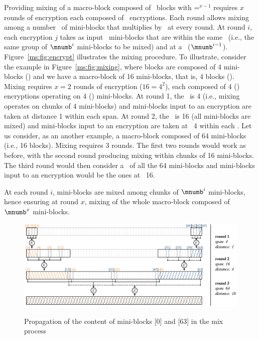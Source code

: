Providing mixing of a macro-block composed of \bnum\ blocks with \bnum=\mnumb$^{x-1}$ requires $x$ rounds of encryption each composed of \bnum\ encryptions. Each round allows mixing among a number \spanna\ of mini-blocks that multiplies by \mnumb\ at every round. At round $i$, each encryption $j$ takes as input \mnumb\ mini-blocks that are within the same \spanna\ (i.e., the same group of $\mnumb^i$ mini-blocks to be mixed) and at a \distance\ ($\mnumb^{i-1}$). Figure~\ref{ms:fig:encrypt} illustrates the mixing procedure. To illustrate, consider the example in Figure~\ref{ms:fig:mixing}, where blocks are composed of 4 mini-blocks () and we have a macro-block of 16 mini-blocks, that is, 4 blocks (). Mixing requires $x=2$ rounds of encryption ($16=4^2$), each composed of 4 (\bnum) encryptions operating on 4 (\mnumb) mini-blocks. At round 1, the \spanna\ is 4 (i.e., mixing operates on chunks of 4 mini-blocks) and mini-blocks input to an encryption are taken at distance 1 within each span. At round 2, the \spanna\ is 16 (all mini-blocks are mixed) and mini-blocks input to an encryption are taken at \distance\ 4 within each \spanna. Let us consider, as an another example, a macro-block composed of 64 mini-blocks (i.e., 16 blocks). Mixing requires 3 rounds. The first two rounds would work as before, with the second round producing mixing within chunks of 16 mini-blocks. The third round would then consider a \spanna\ of all the 64 mini-blocks and mini-blocks input to an encryption would be the ones at \distance\ 16.

At each round $i$, mini-blocks are mixed among chunks of $\mnumb^i$ mini-blocks, hence ensuring at round $x$, mixing of the whole macro-block composed of $\mnumb^x$ mini-blocks.

\begin{figure}[!t]
	\centering
	{\includegraphics[width=\columnwidth]{figures/fig03}}
	\caption{\label{ms:fig:general}Propagation of the content of mini-blocks [0] and [63] in the mix process}
\end{figure}

